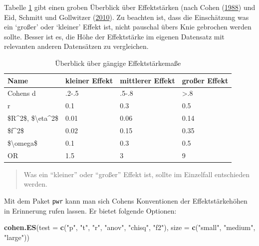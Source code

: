 \documentclass[12pt,ngerman,]{book}
\makeatletter
\newenvironment{Shaded}{\begin{snugshade}}{\end{snugshade}}
\newcommand{\KeywordTok}[1]{\textcolor[rgb]{0.13,0.29,0.53}{\textbf{#1}}}
\newcommand{\DataTypeTok}[1]{\textcolor[rgb]{0.13,0.29,0.53}{#1}}
\newcommand{\StringTok}[1]{\textcolor[rgb]{0.31,0.60,0.02}{#1}}
\newcommand{\NormalTok}[1]{#1}
\newenvironment{kframe}{%
\medskip{}
\setlength{\fboxsep}{.8em}
 \def\at@end@of@kframe{}%
 \ifinner\ifhmode%
  \def\at@end@of@kframe{\end{minipage}}%
  \begin{minipage}{\columnwidth}%
 \fi\fi%
 \def\FrameCommand##1{\hskip\@totalleftmargin \hskip-\fboxsep
 \colorbox{shadecolor}{##1}\hskip-\fboxsep
     \hskip-\linewidth \hskip-\@totalleftmargin \hskip\columnwidth}%
 \MakeFramed {\advance\hsize-\width
   \@totalleftmargin\z@ \linewidth\hsize
   \@setminipage}}%
 {\par\unskip\endMakeFramed%
 \at@end@of@kframe}
\renewenvironment{Shaded}{\begin{kframe}}{\end{kframe}}
\theoremstyle{definition}
\theoremstyle{definition}
\theoremstyle{remark}
\makeatother
\begin{document}
Tabelle \ref{tab:effectsizes} gibt einen groben Überblick über
Effektstärken (nach Cohen
(\protect\hyperlink{ref-cohen_statistical_1988}{1988}) und Eid, Schmitt
und Gollwitzer (\protect\hyperlink{ref-eid2010statistik}{2010}). Zu
beachten ist, dass die Einschätzung was ein `großer' oder `kleiner'
Effekt ist, nicht pauschal übers Knie gebrochen werden sollte. Besser
ist es, die Höhe der Effektstärke im eigenen Datensatz mit relevanten
anderen Datensätzen zu vergleichen.

\begin{table}

\caption{\label{tab:effectsizes}Überblick über gängige Effektstärkemaße}
\centering
\begin{tabular}[t]{l|l|l|l}
\hline
Name & kleiner Effekt & mittlerer Effekt & großer Effekt\\
\hline
Cohens d & .2-.5 & .5-.8 & >.8\\
\hline
r & 0.1 & 0.3 & 0.5\\
\hline
\$R\textasciicircum{}2\$, \$\textbackslash{}eta\textasciicircum{}2\$ & 0.01 & 0.06 & 0.14\\
\hline
\$f\textasciicircum{}2\$ & 0.02 & 0.15 & 0.35\\
\hline
\$\textbackslash{}omega\$ & 0.1 & 0.3 & 0.5\\
\hline
OR & 1.5 & 3 & 9\\
\hline
\end{tabular}
\end{table}

\begin{quote}
Was ein ``kleiner'' oder ``großer'' Effekt ist, sollte im Einzelfall
entschieden werden.
\end{quote}

Mit dem Paket \texttt{pwr} kann man sich Cohens Konventionen der
Effektstärkehöhen in Erinnerung rufen lassen. Er bietet folgende
Optionen:

\begin{Shaded}
\begin{Highlighting}[]
\KeywordTok{cohen.ES}\NormalTok{(}\DataTypeTok{test =} \KeywordTok{c}\NormalTok{(}\StringTok{"p"}\NormalTok{, }\StringTok{"t"}\NormalTok{, }\StringTok{"r"}\NormalTok{, }\StringTok{"anov"}\NormalTok{, }\StringTok{"chisq"}\NormalTok{, }\StringTok{"f2"}\NormalTok{),}
    \DataTypeTok{size =} \KeywordTok{c}\NormalTok{(}\StringTok{"small"}\NormalTok{, }\StringTok{"medium"}\NormalTok{, }\StringTok{"large"}\NormalTok{))}
\end{Highlighting}
\end{Shaded}
\end{document}
